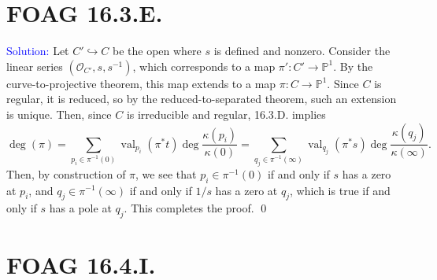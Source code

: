 \documentclass[11pt]{article}
\newcommand{\PP}{\mathbb{P}}
\newcommand{\cO}{\mathcal{O}}
\newcommand{\val}{\operatorname{val}}
\newenvironment{solution}{\begin{trivlist}\item[]{\textcolor{blue}{Solution:}}}{\qed \end{trivlist}}
\begin{document}
\newpage

\section*{FOAG 16.3.E.}

\begin{solution}
    Let $C' \hookrightarrow C$ be the open where $s$ is defined and nonzero. Consider the linear series $(\cO_{C'}, s, s^{-1})$, which corresponds to a map $\pi': C' \rightarrow \PP^1$. By the curve-to-projective theorem, this map extends to a map $\pi: C \rightarrow \PP^1$. Since $C$ is regular, it is reduced, so by the reduced-to-separated theorem, such an extension is unique. Then, since $C$ is irreducible and regular, 16.3.D. implies 
	\begin{equation*}
		\deg(\pi) 
		= \sum_{p_i \in \pi^{-1}(0)} \val_{p_i} (\pi^* t) \deg \frac{\kappa(p_i)}{\kappa(0)}
		= \sum_{q_j \in \pi^{-1}(\infty)} \val_{q_j} (\pi^* s) \deg \frac{\kappa(q_j)}{\kappa(\infty)}.
	\end{equation*}
	Then, by construction of $\pi$, we see that $p_i \in \pi^{-1}(0)$ if and only if $s$ has a zero at $p_i$, and $q_j \in \pi^{-1}(\infty)$ if and only if $1/s$ has a zero at $q_j$, which is true if and only if $s$ has a pole at $q_j$. This completes the proof. 
\end{solution}

\newpage

\section*{FOAG 16.4.I.}
\end{document}
